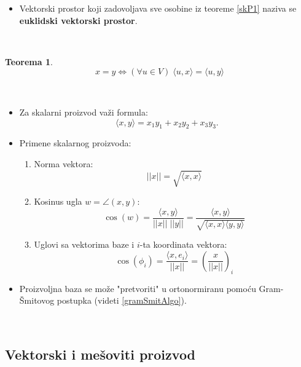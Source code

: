 \documentclass[a4paper,12pt,twoside]{report}
\newtheorem{theorem}{Teorema}[section]
\numberwithin{algorithm}{section}
\begin{document}
\begin{itemize}
    \item Vektorski prostor koji zadovoljava sve osobine iz teoreme \ref{skP1} naziva se \textbf{euklidski vektorski prostor}.
\end{itemize}\

\begin{theorem}
    \[ x = y \iff (\forall u \in V)\; \langle u, x \rangle = \langle u, y \rangle \]
\end{theorem}\
\newpage
\begin{itemize}
    \item Za skalarni proizvod važi formula:
    \[ \langle x, y \rangle = x_1y_1 + x_2y_2 + x_3y_3. \]
    \item Primene skalarnog proizvoda:
    \begin{enumerate}
        \item Norma vektora:
        \[ ||x|| = \sqrt{\langle x, x \rangle} \]
        \item Kosinus ugla $w = \angle (x, y)$:
        \[ \cos(w) = \frac{\langle x, y \rangle}{||x|| \; ||y||} = \frac{\langle x, y \rangle}{\sqrt{\langle x, x \rangle\langle y, y \rangle}} \]
        \item Uglovi sa vektorima baze i $i$-ta koordinata vektora:
        \[ \cos(\phi_i) = \frac{\langle x, e_i \rangle}{||x||} = \left( \frac{x}{||x||} \right)_i\]
    \end{enumerate}
    \item Proizvoljna baza se može "{pretvoriti}" u ortonormiranu pomoću Gram-Šmitovog postupka (videti \ref{gramSmitAlgo}).
\end{itemize}\

\subsection{Vektorski i mešoviti proizvod}
\label{orijentacijaBaze}
\end{document}
